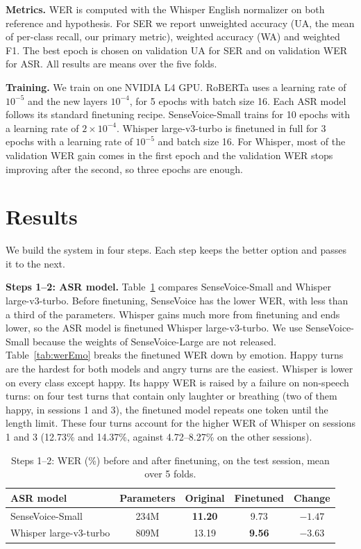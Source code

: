 \documentclass[conference]{IEEEtran}
\newcommand{\tabstyle}{\footnotesize\setlength{\tabcolsep}{3.5pt}}
\begin{document}
\textbf{Metrics.} WER is computed with the Whisper English normalizer on both reference and hypothesis. For SER we
report unweighted accuracy (UA, the mean of per-class recall, our primary metric), weighted accuracy (WA) and weighted
F1. The best epoch is chosen on validation UA for SER and on validation WER for ASR. All results are means over the
five folds.

\textbf{Training.} We train on one NVIDIA L4 GPU. RoBERTa uses a learning rate of $10^{-5}$ and the new layers
$10^{-4}$, for 5 epochs with batch size 16. Each ASR model follows its standard finetuning recipe. SenseVoice-Small
trains for 10 epochs with a learning rate of $2\times10^{-4}$. Whisper large-v3-turbo is finetuned in full for 3
epochs with a learning rate of $10^{-5}$ and batch size 16. For Whisper, most of the validation WER gain comes in the
first epoch and the validation WER stops improving after the second, so three epochs are enough.

\section{Results}
\label{sec:results}

We build the system in four steps. Each step keeps the better option and passes it to the next.

\textbf{Steps 1--2: ASR model.} Table~\ref{tab:asr} compares SenseVoice-Small \cite{an2024funaudiollm} and Whisper
large-v3-turbo. Before finetuning, SenseVoice has the lower WER, with less than a third of the parameters. Whisper
gains much more from finetuning and ends lower, so the ASR model is finetuned Whisper large-v3-turbo. We use
SenseVoice-Small because the weights of SenseVoice-Large are not released. Table~\ref{tab:werEmo} breaks the
finetuned WER down by emotion. Happy turns are the hardest for both models and angry turns are the easiest. Whisper is lower on every class except happy. Its happy WER is raised by a failure on non-speech turns: on four test turns that contain only laughter or breathing (two of them happy, in sessions 1 and 3), the finetuned model repeats one token until the length limit. These four turns account for the higher WER of Whisper on sessions 1 and 3 (12.73\% and 14.37\%, against 4.72--8.27\% on the other sessions).

\begin{table}[!t]
\centering
\caption{Steps 1--2: WER (\%) before and after finetuning, on the test session, mean over 5 folds.}
\label{tab:asr}
\tabstyle
\begin{tabular}{lcccc}
\toprule
ASR model & Parameters & Original & Finetuned & Change \\
\midrule
SenseVoice-Small & 234M & \textbf{11.20} & 9.73 & $-1.47$ \\
Whisper large-v3-turbo & 809M & 13.19 & \textbf{9.56} & $-3.63$ \\
\bottomrule
\end{tabular}
\end{table}
\end{document}

